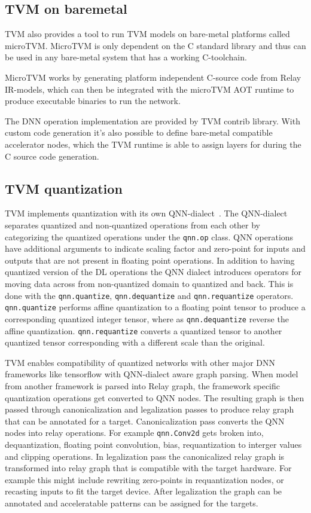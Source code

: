 \documentclass[12pt,a4paper,english
]{tunithesis}
\begin{document}
\subsection{TVM on baremetal}
TVM also provides a tool to run TVM models on bare-metal platforms called microTVM. MicroTVM is only dependent on the C standard library and thus can be used in any bare-metal system that has a working C-toolchain.

MicroTVM works by generating platform independent C-source code from Relay IR-models, which can then be integrated with the microTVM AOT runtime to produce executable binaries to run the network.

The DNN operation implementation are provided by TVM contrib library.
With custom code generation it's also possible to define bare-metal compatible accelerator nodes, which the TVM runtime is able to assign layers for during the C source code generation.~\parencite{TVM}

\subsection{TVM quantization}
TVM implements quantization with its own QNN-dialect~\cite{jain_efficient_2020}. The QNN-dialect separates quantized and non-quantized operations from each other by categorizing the quantized operations under the \texttt{qnn.op} class. QNN operations have additional arguments to indicate scaling factor and zero-point for inputs and outputs that are not present in floating point operations.
In addition to having quantized version of the DL operations the QNN dialect introduces operators for moving data across from non-quantized domain to quantized and back. This is done with the \texttt{qnn.quantize}, \texttt{qnn.dequantize} and \texttt{qnn.requantize} operators. \texttt{qnn.quantize} performs affine quantization to a floating point tensor to produce a corresponding quantized integer tensor, where as \texttt{qnn.dequantize} reverse the affine quantization. \texttt{qnn.requantize} converts a quantized tensor to another quantized tensor corresponding with a different scale than the original.

TVM enables compatibility of quantized networks with other major DNN frameworks like tensorflow with QNN-dialect aware graph parsing. When model from another framework is parsed into Relay graph, the framework specific quantization operations get converted to QNN nodes. The resulting graph is then passed through canonicalization and legalization passes to produce relay graph that can be annotated for a target.
Canonicalization pass converts the QNN nodes into relay operations. For example \texttt{qnn.Conv2d} gets broken into, dequantization, floating point convolution, bias, requantization to interger values and clipping operations.
In legalization pass the canonicalized relay graph is transformed into relay graph that is compatible with the target hardware. For example this might include rewriting zero-points in requantization nodes, or recasting inputs to fit the target device.
After legalization the graph can be annotated and acceleratable patterns can be assigned for the targets.
\end{document}
